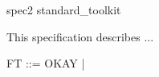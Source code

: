 \documentclass{article}
\begin{document}
\begin{zsection}
  \SECTION spec2 \parents standard\_toolkit
\end{zsection}

This specification describes ...


\begin{zed}
   FT ::= OKAY | \bot
\end{zed}
\end{document}
